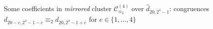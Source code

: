 
\begin{figure}[p]

    \noindent{}

    \captionsetup{singlelinecheck=off}
    \caption[\emph{Mirrored} principal clusters $\mathcal{C}_{\equiv_{2}}^{(4)}$]
        {Some coefficients in \emph{mirrored} cluster $\mathcal{C}_{\equiv_{2}}^{(4)}$ 
        over $\hat{d}_{20,2^{4}-1}$: congruences $d_{20-e,2^{4}-1-e} \equiv_{2} d_{20,2^{4}-1+e}$ 
        for $e\in\lbrace1,\ldots,4\rbrace$ }

    \label{fig:catalan-mirrored-clusters}

\end{figure}
